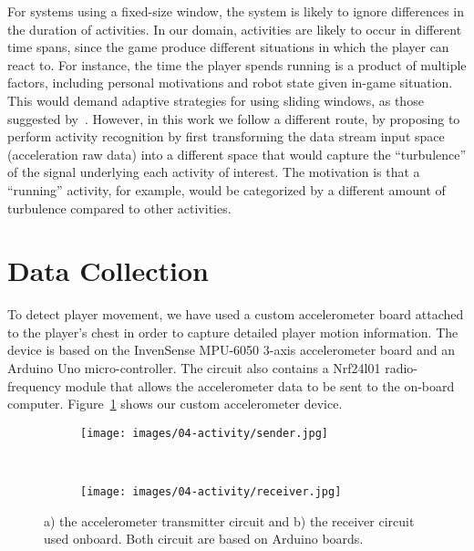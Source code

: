 For systems using a fixed-size window, the system is likely to ignore differences in the duration of activities. In our domain, activities are likely to occur in different time spans, since the game produce different situations in which the player can react to. For instance, the time the player spends running is a product of multiple factors, including personal motivations and robot state given in-game situation. This would demand adaptive strategies for using sliding windows, as those suggested by~\cite{noor_adaptive_2016}. However, in this work we follow a different route, by proposing to perform activity recognition by first transforming the data stream input space (acceleration raw data) into a different space that would capture the ``turbulence'' of the signal underlying each activity of interest. The motivation is that a ``running'' activity, for example, would be categorized by a different amount of turbulence compared to other activities.

\section{Data Collection}\label{sec:data_collection}

To detect player movement, we have used a custom accelerometer board attached to the player's chest in order to capture detailed player motion information. The device is based on the InvenSense MPU-6050 3-axis accelerometer board and an Arduino Uno micro-controller. The circuit also contains a Nrf24l01 radio-frequency module that allows the accelerometer data to be sent to the on-board computer. Figure~\ref{fig:the_accelerometer} shows our custom accelerometer device.

\begin{figure}[H]
      \centering
      \begin{subfigure}[t]{0.5\textwidth}
      	\centering
	    \texttt{[image: images/04-activity/sender.jpg]}
	    \caption{}
	  \end{subfigure}
	  ~
	  \begin{subfigure}[t]{0.5\textwidth}
      	\centering
	    \texttt{[image: images/04-activity/receiver.jpg]}
	    \caption{}
	  \end{subfigure}
      \caption{a) the accelerometer transmitter circuit and b) the receiver circuit used onboard. Both circuit are based on Arduino boards.}\label{fig:the_accelerometer}
\end{figure}

